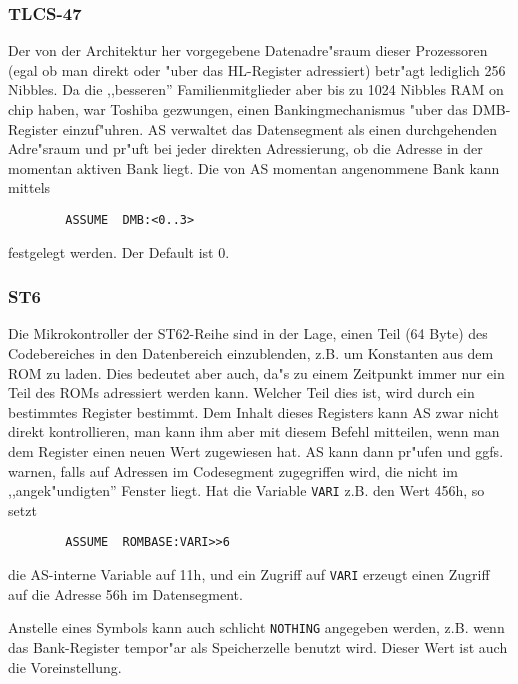 \documentclass[12pt,a4paper,twoside]{report}
\newcommand{\tty}[1]{{\tt #1}}
\begin{document}

\subsubsection{TLCS-47}

Der von der Architektur her vorgegebene Datenadre"sraum dieser
Prozessoren (egal ob man direkt oder "uber das HL-Register adressiert)
betr"agt lediglich 256 Nibbles.  Da die ,,besseren'' Familienmitglieder
aber bis zu 1024 Nibbles RAM on chip haben, war Toshiba gezwungen, einen
Bankingmechanismus "uber das DMB-Register einzuf"uhren.  AS verwaltet
das Datensegment als einen durchgehenden Adre"sraum und pr"uft bei jeder
direkten Adressierung, ob die Adresse in der momentan aktiven Bank
liegt.  Die von AS momentan angenommene Bank kann mittels
\begin{verbatim}
        ASSUME  DMB:<0..3>
\end{verbatim}
festgelegt werden.  Der Default ist 0.


\subsubsection{ST6}
\label{ST6Assume}

Die Mikrokontroller der ST62-Reihe sind in der Lage, einen Teil (64 Byte)
des Codebereiches in den Datenbereich einzublenden, z.B. um Konstanten aus
dem ROM zu laden.  Dies bedeutet aber auch, da"s zu einem Zeitpunkt immer
nur ein Teil des ROMs adressiert werden kann.  Welcher Teil dies ist, wird
durch ein bestimmtes Register bestimmt.  Dem Inhalt dieses Registers kann
AS zwar nicht direkt kontrollieren, man kann ihm aber mit diesem Befehl
mitteilen, wenn man dem Register einen neuen Wert zugewiesen hat.  AS kann
dann pr"ufen und ggfs. warnen, falls auf Adressen im Codesegment
zugegriffen wird, die nicht im ,,angek"undigten'' Fenster liegt.
Hat die Variable \tty{VARI} z.B. den Wert 456h, so setzt
\begin{verbatim}
        ASSUME  ROMBASE:VARI>>6
\end{verbatim}
die AS-interne Variable auf 11h, und ein Zugriff auf \tty{VARI} erzeugt einen
Zugriff auf die Adresse 56h im Datensegment.

Anstelle eines Symbols kann auch schlicht \tty{NOTHING} angegeben
werden, z.B. wenn das Bank-Register tempor"ar als Speicherzelle benutzt
wird.  Dieser Wert ist auch die Voreinstellung.
\end{document}

